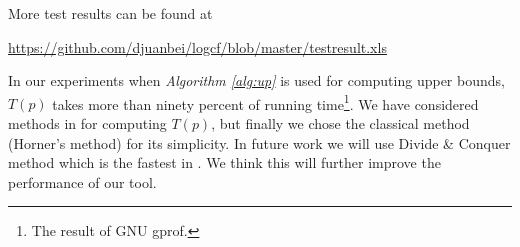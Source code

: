 More test results can be found at
	
	 \url{https://github.com/djuanbei/logcf/blob/master/testresult.xls}

In our experiments when {\em Algorithm \ref{alg:up}} is used for computing upper bounds, $T(p)$  takes  more than ninety percent of running time\footnote{The result of  GNU gprof.}.  We have considered methods in \cite{ger04} for computing $T(p)$, but finally we chose the  classical method (Horner's method) for its simplicity. In future work we will use Divide \& Conquer method which is the fastest in \cite{ger04}. We think this will further improve the performance of our tool.

\begin{comment}
\begin{table}
  \centering
  \captionof{table}{ compare with \cf\ under old environment } \label{tab:open}
  \begin{tabular}{|| c| c| c|| c|c| c||}
\hline

\hline
\scriptsize{Benchmark}  &\ \  \ \    \ \ \scriptsize{\cf}\ \  \ \  \ \     & \scriptsize{\froot} &\scriptsize{ Benchmark}  &\ \   \ \ \ \  \ \scriptsize{ \cf} \  \  \ \ \ \    \    & \scriptsize{\froot}\\
\hline
$W_{100}$ & 0.054 & 0.01 &  $IW_{100}$ & 0.056 & 0.01\\
\hline
$W_{200}$ & 0.23 & 0.015 & $IW_{200}$ & 0.20 & 0.015\\
\hline
$mW_{100}$ & 0.054 & 0.025& $mIW_{100}$ & 0.14 & 0.01\\
\hline
$mW_{200}$ & 40.5 & 0.16& $mIW_{200}$ & 2.7 & 0.04\\
\hline
$T_{100}$ & 0.52 &  0.01 & $L_{100}$ & 0.80 & 0.02  \\

\hline
$T_{200}$ & 4.32 &  0.13& $L_{200}$ & 7.50 &0.16 \\

\hline
$U_{100}$ & 0.52 &  0.01& $M_{1000}$ & 43.52 & 0.03 \\

\hline
$U_{200}$ & 4.15 &  0.12& $M_{1200}$ & 88 & 0.05 \\

\hline

\hline
  \end{tabular}%
\end{table}


\begin{figure}
	\begin{centering}
		\texttt{[image: com]}
		\caption{ compare with numerical software  \eign\  on old environment\label{fig:1}}
	\end{centering}
\end{figure}

\end{comment}
